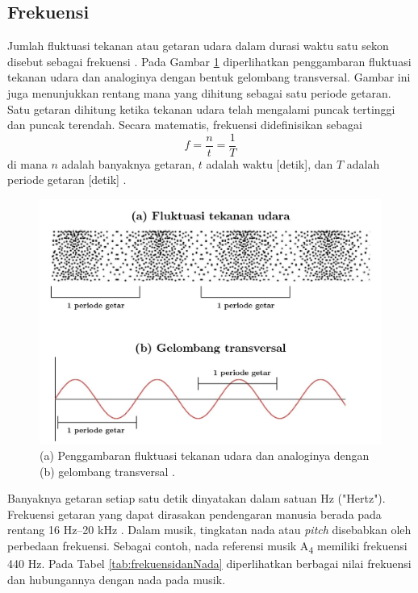\subsection{Frekuensi}
Jumlah fluktuasi tekanan atau getaran udara dalam durasi waktu satu sekon disebut sebagai frekuensi \cite{meyer}. Pada Gambar \ref{fig:gambar-frekuensi} diperlihatkan penggambaran fluktuasi tekanan udara dan analoginya dengan bentuk gelombang transversal. Gambar ini juga menunjukkan rentang mana yang dihitung sebagai satu periode getaran. Satu getaran dihitung ketika tekanan udara telah mengalami puncak tertinggi dan puncak terendah. Secara matematis, frekuensi didefinisikan sebagai
\begin{equation}
    f=\frac{n}{t}=\frac{1}{T}
\end{equation}
di mana $n$ adalah banyaknya getaran, $t$ adalah waktu [detik], dan $T$ adalah periode getaran [detik] \cite{bukuFletcher}. \par
\begin{figure}[t!]
    \centering
    \includegraphics[width=12cm]{Gambar/gambar-frekuensi-03.jpg}
    \caption{(a) Penggambaran fluktuasi tekanan udara dan analoginya dengan (b) gelombang transversal \cite{handbookAcoustic}.}
    \label{fig:gambar-frekuensi}
\end{figure}
Banyaknya getaran setiap satu detik dinyatakan dalam satuan Hz ("Hertz"). Frekuensi getaran yang dapat dirasakan pendengaran manusia berada pada rentang 16 Hz--20 kHz \cite{meyer}. Dalam musik, tingkatan nada atau \textit{pitch} disebabkan oleh perbedaan frekuensi. Sebagai contoh, nada referensi musik A\textsubscript{4} memiliki frekuensi 440 Hz. Pada Tabel \ref{tab:frekuensidanNada} diperlihatkan berbagai nilai frekuensi dan hubungannya dengan nada pada musik. \par
